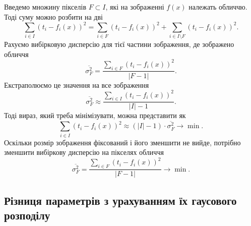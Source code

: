 Введемо множину пікселів $F \subset I$,
які на зображенні $f\left( x \right)$ належать обличчю.
Тоді суму можно розбити на дві
\begin{equation*}
  \sum_{i \in I} \left( t_i - f_i\left( x \right) \right)^2
  = \sum_{i \in F} \left( t_i - f_i\left( x \right) \right)^2
  + \sum_{i \in I \setminus F} \left( t_i - f_i\left( x \right) \right)^2.
\end{equation*}
Рахуємо вибірковую дисперсію для тієї частини зображення,
де зображено обличчя
\begin{equation*}
  \overline{\sigma_F^2}
  = \frac{\sum\limits_{i \in F} \left( t_i - f_i\left( x \right) \right)^2}
    {\left| F - 1 \right|}.
\end{equation*}
Екстраполюємо це значення на все зображення
\begin{equation*}
  \overline{\sigma_F^2}
  \approx \frac{\sum\limits_{i \in I}
             \left( t_i - f_i\left( x \right) \right)^2}
            {\left| I \right| - 1}.
\end{equation*}
Тоді вираз, який треба мінімізувати, можна представити як
\begin{equation*}
  \sum_{i \in I} \left( t_i - f_i\left( x \right) \right)^2
  \approx \left( \left| I \right| - 1 \right) \cdot \overline{\sigma_F^2}
  \to \min.
\end{equation*}
Оскільки розмір зображення фіксований і його зменшити не вийде,
потрібно зменшити вибіркову дисперсію на пікселях обличчя
\begin{equation*}
  \overline{\sigma_F^2}
  = \frac{\sum\limits_{i \in F} \left( t_i - f_i\left( x \right) \right)^2}
         {\left| F - 1 \right|}
  \to \min.
\end{equation*}

\subsection{Різниця параметрів з урахуванням їх гаусового розподілу}

